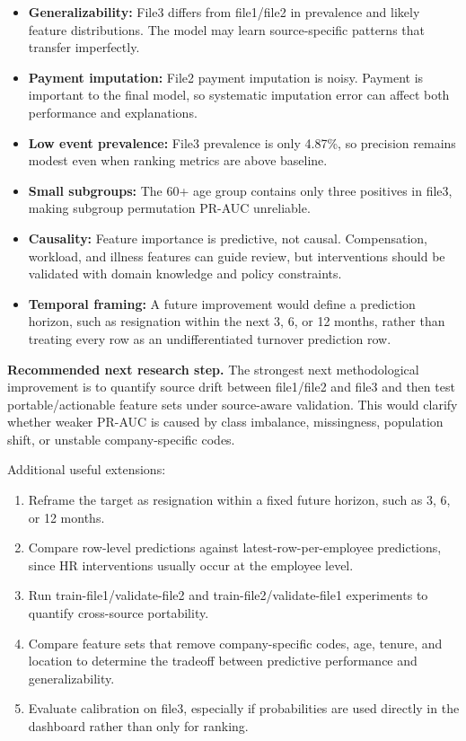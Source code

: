\documentclass[11pt]{article}
\begin{document}
\begin{itemize}
    \item \textbf{Generalizability:} File3 differs from file1/file2 in prevalence and likely feature distributions. The model may learn source-specific patterns that transfer imperfectly.
    \item \textbf{Payment imputation:} File2 payment imputation is noisy. Payment is important to the final model, so systematic imputation error can affect both performance and explanations.
    \item \textbf{Low event prevalence:} File3 prevalence is only 4.87\%, so precision remains modest even when ranking metrics are above baseline.
    \item \textbf{Small subgroups:} The 60+ age group contains only three positives in file3, making subgroup permutation PR-AUC unreliable.
    \item \textbf{Causality:} Feature importance is predictive, not causal. Compensation, workload, and illness features can guide review, but interventions should be validated with domain knowledge and policy constraints.
    \item \textbf{Temporal framing:} A future improvement would define a prediction horizon, such as resignation within the next 3, 6, or 12 months, rather than treating every row as an undifferentiated turnover prediction row.
\end{itemize}

\textbf{Recommended next research step.} The strongest next methodological improvement is to quantify source drift between file1/file2 and file3 and then test portable/actionable feature sets under source-aware validation. This would clarify whether weaker PR-AUC is caused by class imbalance, missingness, population shift, or unstable company-specific codes.

Additional useful extensions:
\begin{enumerate}
    \item Reframe the target as resignation within a fixed future horizon, such as 3, 6, or 12 months.
    \item Compare row-level predictions against latest-row-per-employee predictions, since HR interventions usually occur at the employee level.
    \item Run train-file1/validate-file2 and train-file2/validate-file1 experiments to quantify cross-source portability.
    \item Compare feature sets that remove company-specific codes, age, tenure, and location to determine the tradeoff between predictive performance and generalizability.
    \item Evaluate calibration on file3, especially if probabilities are used directly in the dashboard rather than only for ranking.
\end{enumerate}
\end{document}
